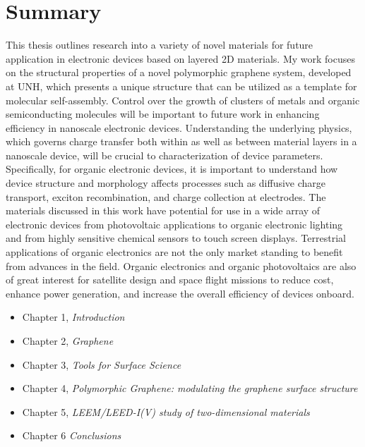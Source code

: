 \section{Summary}
This thesis outlines research into a variety of novel materials for future application in electronic devices based on layered 2D materials. 
	My work focuses on the structural properties of a novel polymorphic graphene system, developed at UNH, which presents a unique structure that can be utilized as a template for molecular self-assembly. Control over the growth of clusters of metals and organic semiconducting molecules will be important to future work in enhancing efficiency in nanoscale electronic devices. Understanding the underlying physics, which governs charge transfer both within as well as between material layers in a nanoscale device, will be crucial to characterization of device parameters. Specifically, for organic electronic devices, it is important to understand how device structure and morphology affects processes such as diffusive charge transport, exciton recombination, and charge collection at electrodes.
	The materials discussed in this work have potential for use in a wide array of electronic devices from photovoltaic applications to organic electronic lighting and from highly sensitive chemical sensors to touch screen displays. Terrestrial applications of organic electronics are not the only market standing to benefit from advances in the field. Organic electronics and organic photovoltaics are also of great interest for satellite design and space flight missions to reduce cost, enhance power generation, and increase the overall efficiency of devices onboard.

\begin{itemize}
\item Chapter 1, \emph{Introduction} 
\item Chapter 2, \emph{Graphene}
\item Chapter 3, \emph{Tools for Surface Science}
\item Chapter 4, \emph{Polymorphic Graphene: modulating the graphene surface structure}
\item Chapter 5, \emph{LEEM/LEED-I(V) study of two-dimensional materials}
\item Chapter 6 \emph{Conclusions}
\end{itemize}

